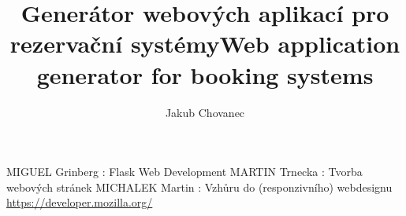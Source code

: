 \documentclass[
  program=itp,
  figures=false,
  tables=false,
  sourcecodes,
  index
]{kidiplom}
\title{Generátor webových aplikací pro rezervační systémy}
\title[english]{Web application generator for booking systems}
\author{Jakub Chovanec}
\begin{document}
\maketitle

\begin{thebibliography}{3}

 \uppercase{Miguel} Grinberg : Flask Web Development
 \uppercase{Martin} Trnecka : Tvorba webových stránek
 \uppercase{Michalek} Martin : Vzhůru do (responziv­ního) webdesignu
 \url{https://developer.mozilla.org/}

\end{thebibliography}

\printindex
\end{document}
